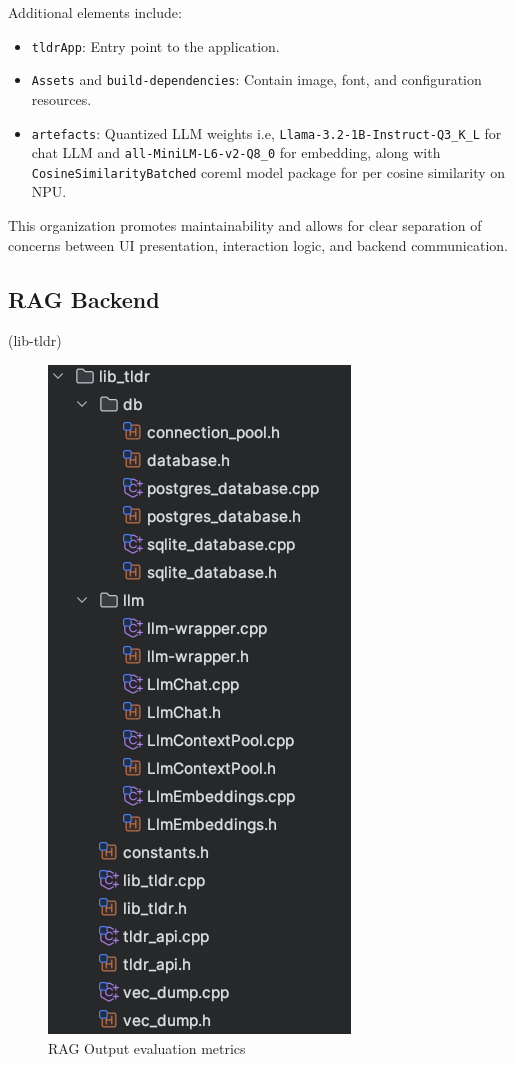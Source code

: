Additional elements include:
\begin{itemize}
    \item \texttt{tldrApp}: Entry point to the application.
    \item \texttt{Assets} and \texttt{build-dependencies}: Contain image, font, and configuration resources.
    \item \texttt{artefacts}: Quantized LLM weights i.e, \texttt{Llama-3.2-1B-Instruct-Q3\_K\_L} for chat LLM and \texttt{all-MiniLM-L6-v2-Q8\_0} for embedding, along with \texttt{CosineSimilarityBatched} coreml model package for per cosine similarity on NPU.
\end{itemize}

This organization promotes maintainability and allows for clear separation of concerns between UI presentation, interaction logic, and backend communication.

\subsection{RAG Backend}
\label{subsec:AppDesignModules-RAG Backend}
 (lib-tldr)
\begin{figure}[H]
    \centering
    \includegraphics[width=0.5\linewidth]{images/ui-proj-fs.png}
    \caption{RAG Output evaluation metrics ~\cite{cardenas2023rag}}
    \label{fig:autoregressive_decoding}
\end{figure}



